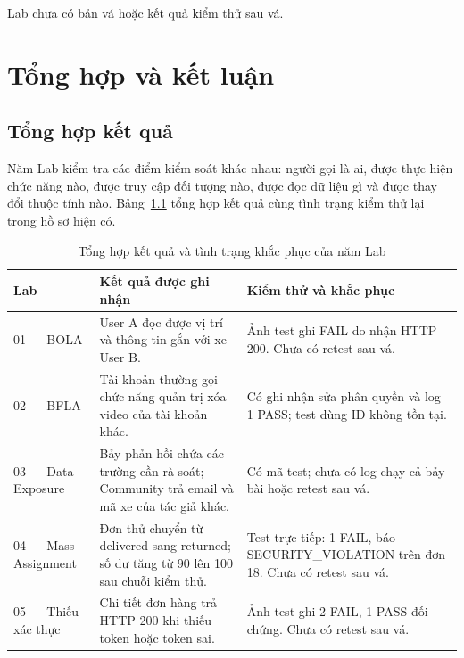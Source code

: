 \documentclass[oneside,a4paper,12pt]{extreport}
\begin{document}
Lab chưa có bản vá hoặc kết quả kiểm thử sau vá.

\clearpage
\chapter{Tổng hợp và kết luận}
\label{chap:conclusion}

\section{Tổng hợp kết quả}

Năm Lab kiểm tra các điểm kiểm soát khác nhau: người gọi là ai, được
thực hiện chức năng nào, được truy cập đối tượng nào, được đọc dữ liệu
gì và được thay đổi thuộc tính nào. Bảng~\ref{tab:overall-results}
tổng hợp kết quả cùng tình trạng kiểm thử lại trong hồ sơ hiện có.

\begin{table}[htbp]
\centering
\caption{Tổng hợp kết quả và tình trạng khắc phục của năm Lab}
\label{tab:overall-results}
\begin{singlespace}
\small
\begin{tabularx}{\textwidth}{@{} p{} X p{} @{}}
\toprule
\textbf{Lab} & \textbf{Kết quả được ghi nhận} & \textbf{Kiểm thử và khắc phục} \\
\midrule
01 --- BOLA & User A đọc được vị trí và thông tin gắn với xe User B. & Ảnh test ghi FAIL do nhận HTTP 200. Chưa có retest sau vá. \\[4pt]
02 --- BFLA & Tài khoản thường gọi chức năng quản trị xóa video của tài khoản khác. & Có ghi nhận sửa phân quyền và log 1 PASS; test dùng ID không tồn tại. \\[4pt]
03 --- Data Exposure & Bảy phản hồi chứa các trường cần rà soát; Community trả email và mã xe của tác giả khác. & Có mã test; chưa có log chạy cả bảy bài hoặc retest sau vá. \\[4pt]
04 --- Mass Assignment & Đơn thử chuyển từ delivered sang returned; số dư tăng từ 90 lên 100 sau chuỗi kiểm thử. & Test trực tiếp: 1 FAIL, báo SECURITY\_VIOLATION trên đơn 18. Chưa có retest sau vá. \\[4pt]
05 --- Thiếu xác thực & Chi tiết đơn hàng trả HTTP 200 khi thiếu token hoặc token sai. & Ảnh test ghi 2 FAIL, 1 PASS đối chứng. Chưa có retest sau vá. \\
\bottomrule
\end{tabularx}
\end{singlespace}
\end{table}
\end{document}
